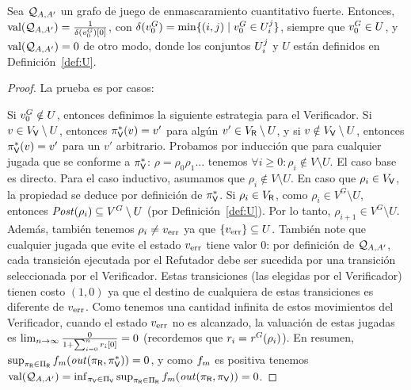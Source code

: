 \begin{theorem} \label{thm:quant_game}
  Sea $\QMStrGame$ un grafo de juego de enmascaramiento cuantitativo fuerte.
  \sloppy Entonces, $\val(\QMStrGame) = \frac{1}{\pr{0}{\delta(\InitVertex^G)}}$, con
  $\delta(\InitVertex^G) = \min \{ (i,j) \mid  \InitVertex^G \in \setsUs \}$, siempre que
  $\InitVertex^G \in U$, y $\val(\QMStrGame)=0$ de otro modo, donde los conjuntos
   $\setsUs$ y $U$ están definidos en Definición~\ref{def:U}.

\end{theorem}
\iffalse
\begin{proof} La prueba es por casos:
	
	Si $\InitVertex^G \notin U$, entonces definimos la siguiente estrategia para el Verificador. Si $v \in V_\Verifier \setminus U$, entonces $\pi^*_\Verifier(v)=v'$ 
	para algún $v' \in V_\Refuter \setminus U$, y si $v \notin  V_\Verifier \setminus U$, entonces $\pi^*_\Verifier(v) = v'$ para un $v'$ arbitrario. 
	Probamos por inducción que para cualquier jugada que se conforme a $\pi^*_\Verifier$: $\rho =\rho_0 \rho_1 \dots$ tenemos $\forall i \geq 0: \rho_i \notin V \setminus U$. El caso base es directo. 
Para el caso inductivo, asumamos que $\rho_i \notin V \setminus U$. En caso que $\rho_i \in V_\Verifier$, la propiedad se deduce por definición de
$\pi^*_\Verifier$. Si $\rho_i \in V_\Refuter$, como $\rho_i \in V^G \setminus U$, entonces $\post(\rho_i) \subseteq V^G \setminus U$ (por Definición~\ref{def:U}). 
Por lo tanto, $\rho_{i+1} \in V^G \setminus U$. 
	 Además, también tenemos $\rho_i \neq \ErrorSt$ ya que $\{ \ErrorSt \} \subseteq U$. También note que cualquier jugada que evite el estado $\ErrorSt$ tiene valor $0$: por definición de $\QMStrGame$, cada transición ejecutada por el Refutador debe ser sucedida por una transición seleccionada por el Verificador. Estas transiciones (las elegidas por el Verificador) tienen costo $(1,0)$ ya que el destino de cualquiera de estas transiciones es diferente de $\ErrorSt$. Como tenemos una cantidad infinita de estos movimientos del Verificador, cuando el estado $\ErrorSt$ no es alcanzado, la valuación de estas jugadas es $\lim_{n\rightarrow \infty} \frac{0}{1+ \sum^n_{i=0} \pr{0}{r_i}} = 0$ (recordemos que $r_i = \reward^G(\rho_i)$). 
En resumen, $\sup_{\pi_\Refuter \in \Pi_\Refuter} \FMask(\out(\pi_\Refuter, \pi^*_\Verifier)) = 0$, y como $\FMask$ es positiva
tenemos $\val(\QMStrGame) = \inf_{\pi_\Verifier \in \Pi_\Verifier} \sup_{\pi_\Refuter \in \Pi_\Refuter} \FMask(\out(\pi_\Refuter, \pi_\Verifier)) = 0$.


\end{proof}
